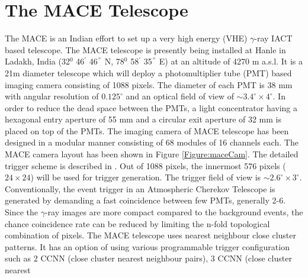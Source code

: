 \documentclass[preprint,12pt]{elsarticle}
\begin{document}
\section{The MACE Telescope}
\label{intro}
The MACE is an Indian effort to set up a very high energy (VHE) $\gamma$-ray IACT based telescope. The MACE telescope 
is presently being installed at Hanle in Ladakh, India (32$^0$  46$^{'}$ 46$^{"}$ N, 78$^0$ 58$^{'}$ 35$^{"}$ E) at an altitude of 4270 m a.s.l. It is a 21m diameter 
telescope which will deploy a photomultiplier tube (PMT) based imaging camera consisting of 1088 pixels. %
The diameter of each PMT is 38 mm with angular resolution of $0.125^{\circ}$ and  an optical field of view 
of $\sim 3.4^{\circ} \times 4^{\circ}$. In order to reduce the dead space between the PMTs, a light concentrator having a hexagonal entry
aperture of 55 mm  and a circular exit aperture of 32 mm is placed on top of the PMTs. %
The imaging camera of MACE telescope has been designed in a modular manner consisting of 68 modules of 16 channels each. The MACE camera layout has been shown 
in Figure \ref{Figure:maceCam}. The detailed trigger scheme is described in \cite{chinmayB}. Out of 1088 pixels, the innermost 576 pixels ($24 \times 24$) will be used for 
trigger generation. The trigger field of view is $\sim 2.6^{\circ} \times 3^{\circ}$. Conventionally, the event trigger in an Atmospheric Cherekov Telescope is generated by 
demanding a fast coincidence between few PMTs, generally 2-6. Since the $\gamma$-ray images are more compact compared to the background events, the chance coincidence 
rate can be reduced by limiting the n-fold topological combination of pixels. The MACE telescope uses nearest neighbour close cluster 
patterns. It has an option of using various programmable trigger configuration such as 2 CCNN (close cluster nearest neighbour pairs), 3 CCNN (close cluster nearest 
\end{document}
